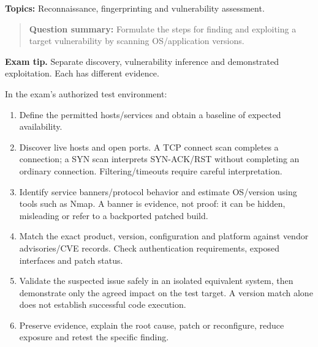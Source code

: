 \documentclass[11pt,a4paper]{article}
\begin{document}
\textbf{Topics:} Reconnaissance,\allowbreak{} fingerprinting and vulnerability assessment.



\begin{quote}\small

\textbf{Question summary:} Formulate the steps for finding and exploiting a target vulnerability by scanning OS/\allowbreak{}application versions.



\end{quote}


{\color{ForestGreen}\textbf{Exam tip.} Separate discovery,\allowbreak{} vulnerability inference and demonstrated exploitation. Each has different evidence.}


In the exam's authorized test environment:



\begin{enumerate}

\item Define the permitted hosts/\allowbreak{}services and obtain a baseline of expected availability.

\item Discover live hosts and open ports. A TCP connect scan completes a connection; a SYN scan interprets SYN-ACK/\allowbreak{}RST without completing an ordinary connection. Filtering/\allowbreak{}timeouts require careful interpretation.

\item Identify service banners/\allowbreak{}protocol behavior and estimate OS/\allowbreak{}version using tools such as Nmap. A banner is evidence,\allowbreak{} not proof: it can be hidden,\allowbreak{} misleading or refer to a backported patched build.

\item Match the exact product,\allowbreak{} version,\allowbreak{} configuration and platform against vendor advisories/\allowbreak{}CVE records. Check authentication requirements,\allowbreak{} exposed interfaces and patch status.

\item Validate the suspected issue safely in an isolated equivalent system,\allowbreak{} then demonstrate only the agreed impact on the test target. A version match alone does not establish successful code execution.

\item Preserve evidence,\allowbreak{} explain the root cause,\allowbreak{} patch or reconfigure,\allowbreak{} reduce exposure and retest the specific finding.

\end{enumerate}
\end{document}
